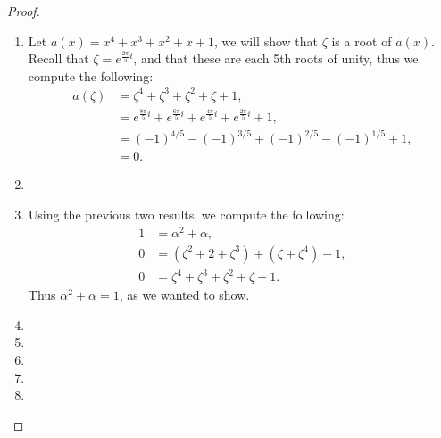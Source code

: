 \documentclass[letterpaper, 12pt]{amsart}
\theoremstyle{definition}  %
\begin{document}
	\begin{proof} \
		\begin{enumerate}[\hspace{5mm}(a)]
			\item Let $a(x) = x^{4} + x^{3} + x^{2} + x + 1$, we will show that $\zeta$ is a root of $a(x)$.
			Recall that $\zeta = e^{\frac{2\pi}{5}i}$, and that these are each 5th roots of unity, thus we compute the following:
			\begin{align*}
			a(\zeta) &= \zeta^{4} + \zeta^{3} + \zeta^{2} + \zeta + 1, \\
			&= e^{\frac{8\pi}{5}i} + e^{\frac{6\pi}{5}i} + e^{\frac{4\pi}{5}i} + e^{\frac{2\pi}{5}i} + 1, \\
			&= (-1)^{4/5} - (-1)^{3/5} + (-1)^{2/5} - (-1)^{1/5} + 1, \\
			&= 0.
			\end{align*}
			

			\item 

			\item Using the previous two results, we compute the following:
			\begin{align*}
			1 &= \alpha^{2} + \alpha, \\
			0 &= (\zeta^{2} + 2 + \zeta^{3}) + (\zeta + \zeta^{4}) - 1, \\
			0 &= \zeta^{4} + \zeta^{3} + \zeta^{2} + \zeta + 1.
			\end{align*}
			Thus $\alpha^{2} + \alpha = 1$, as we wanted to show.

			\item 

			\item 

			\item 

			\item 

			\item 
		\end{enumerate}
	\end{proof}
\end{document}
